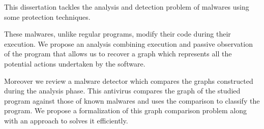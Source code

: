 This dissertation tackles the analysis and detection problem of malwares using some protection techniques.

These malwares, unlike regular programs, modify their code during their execution.
We propose an analysis combining execution and passive observation of the program that allows us to recover a graph which represents all the potential actions undertaken by the software.

Moreover we review a malware detector which compares the graphs constructed during the analysis phase. 
This antivirus compares the graph of the studied program against those of known malwares and uses the comparison to classify the program.
We propose a formalization of this graph comparison problem along with an approach to solves it efficiently.